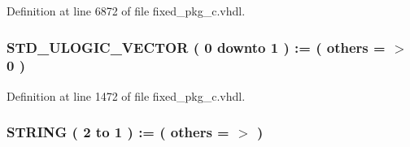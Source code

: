 Definition at line 6872 of file fixed\+\_\+pkg\+\_\+c.\+vhdl.

\hypertarget{class__fixed__pkg_a3575e58926817f265cfa6d013accb240}{}
\subsubsection[{N\+S\+L\+V}]{ {\bfseries \textcolor{comment}{S\+T\+D\+\_\+\+U\+L\+O\+G\+I\+C\+\_\+\+V\+E\+C\+T\+O\+R}\textcolor{vhdlchar}{ }\textcolor{vhdlchar}{(}\textcolor{vhdlchar}{ }\textcolor{vhdlchar}{ } \textcolor{vhdldigit}{0} \textcolor{vhdlchar}{ }\textcolor{keywordflow}{downto}\textcolor{vhdlchar}{ }\textcolor{vhdlchar}{ } \textcolor{vhdldigit}{1} \textcolor{vhdlchar}{ }\textcolor{vhdlchar}{)}\textcolor{vhdlchar}{ }\textcolor{vhdlchar}{ }\textcolor{vhdlchar}{ }\textcolor{vhdlchar}{\+:}\textcolor{vhdlchar}{=}\textcolor{vhdlchar}{ }\textcolor{vhdlchar}{(}\textcolor{vhdlchar}{ }\textcolor{vhdlchar}{ }\textcolor{keywordflow}{others}\textcolor{vhdlchar}{ }\textcolor{vhdlchar}{ }\textcolor{vhdlchar}{=}\textcolor{vhdlchar}{ }\textcolor{vhdlchar}{$>$}\textcolor{vhdlchar}{ }\textcolor{vhdlchar}{\textquotesingle{}}\textcolor{vhdlchar}{ } \textcolor{vhdldigit}{0} \textcolor{vhdlchar}{ }\textcolor{vhdlchar}{\textquotesingle{}}\textcolor{vhdlchar}{ }\textcolor{vhdlchar}{)}\textcolor{vhdlchar}{ }} \hspace{0.3cm}{\ttfamily [Constant]}}\label{class__fixed__pkg_a3575e58926817f265cfa6d013accb240}


Definition at line 1472 of file fixed\+\_\+pkg\+\_\+c.\+vhdl.

\hypertarget{class__fixed__pkg_a88459acb584ef0053a7b4eafa97ad818}{}
\subsubsection[{N\+U\+S}]{ {\bfseries \textcolor{comment}{S\+T\+R\+I\+N\+G}\textcolor{vhdlchar}{ }\textcolor{vhdlchar}{(}\textcolor{vhdlchar}{ }\textcolor{vhdlchar}{ } \textcolor{vhdldigit}{2} \textcolor{vhdlchar}{ }\textcolor{keywordflow}{to}\textcolor{vhdlchar}{ }\textcolor{vhdlchar}{ } \textcolor{vhdldigit}{1} \textcolor{vhdlchar}{ }\textcolor{vhdlchar}{)}\textcolor{vhdlchar}{ }\textcolor{vhdlchar}{ }\textcolor{vhdlchar}{ }\textcolor{vhdlchar}{\+:}\textcolor{vhdlchar}{=}\textcolor{vhdlchar}{ }\textcolor{vhdlchar}{(}\textcolor{vhdlchar}{ }\textcolor{vhdlchar}{ }\textcolor{keywordflow}{others}\textcolor{vhdlchar}{ }\textcolor{vhdlchar}{ }\textcolor{vhdlchar}{=}\textcolor{vhdlchar}{ }\textcolor{vhdlchar}{$>$}\textcolor{vhdlchar}{ }\textcolor{vhdlchar}{\textquotesingle{}}\textcolor{vhdlchar}{ }\textcolor{vhdlchar}{ }\textcolor{vhdlchar}{\textquotesingle{}}\textcolor{vhdlchar}{ }\textcolor{vhdlchar}{)}\textcolor{vhdlchar}{ }} \hspace{0.3cm}{\ttfamily [Constant]}}\label{class__fixed__pkg_a88459acb584ef0053a7b4eafa97ad818}


